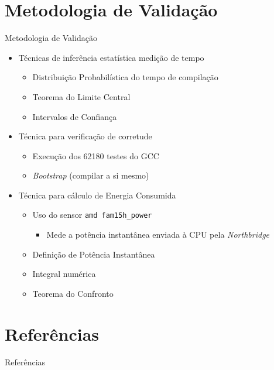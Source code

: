 \section{Metodologia de Validação}

\begin{frame}{Metodologia de Validação}
    \begin{itemize}
        \item Técnicas de inferência estatística medição de tempo
            \begin{itemize}
                \item Distribuição Probabilística do tempo de compilação
                \item Teorema do Limite Central
                \item Intervalos de Confiança
            \end{itemize}
        \item Técnica para verificação de corretude
            \begin{itemize}
                \item Execução dos 62180 testes do GCC
                \item \textit{Bootstrap} (compilar a si mesmo)
            \end{itemize}
        \item Técnica para cálculo de Energia Consumida
        \begin{itemize}
            \item Uso do sensor \texttt{amd fam15h\_power}
            \begin{itemize}
                \item Mede a potência instantânea enviada à CPU pela \textit{Northbridge}
            \end{itemize}

            \item Definição de Potência Instantânea
            \item Integral numérica
            \item Teorema do Confronto
        \end{itemize}
    \end{itemize}
\end{frame}

\section{Referências}

\begin{frame}[allowframebreaks]{Referências}
  \printbibliography
\end{frame}

